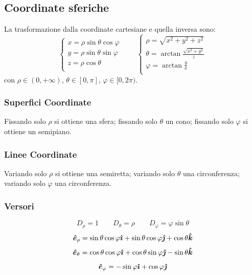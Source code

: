 \subsection{Coordinate sferiche}
La trasformazione dalla coordinate cartesiane e quella inversa sono:
\begin{equation*}\left\{\begin{array}{l}
x=\rho\sin\theta\cos\varphi\\
y=\rho\sin\theta\sin\varphi\\
z=\rho\cos\theta\\
\end{array}\right.
\qquad
\left\{\begin{array}{l}
\rho=\sqrt{x^2+y^2+z^2}\\
\theta=\arctan\frac{\sqrt{x^2+y^2}}{z}\\
\varphi=\arctan\frac{y}{x}\\
\end{array}\right.
\end{equation*}
con $\rho\in(0,+\infty)$, $\theta\in[0,\pi]$, $\varphi\in[0,2\pi)$.
\subsubsection{Superfici Coordinate}
Fissando solo $\rho$ si ottiene una sfera; fissando solo $\theta$ un cono; fissando solo $\varphi$ si ottiene un semipiano.
\subsubsection{Linee Coordinate}
Variando solo $\rho$ si ottiene una semiretta; variando solo $\theta$ una circonferenza; variando solo $\varphi$ una circonferenza.
\subsubsection{Versori}
\begin{equation*}D_\rho=1\qquad D_\theta=\rho\qquad D_\varphi=\varphi\sin\theta\end{equation*}
\begin{equation*}\boldsymbol{\hat {e}}_\rho=\sin\theta\cos\varphi\boldsymbol{\hat {\imath}}+\sin\theta\cos\varphi\boldsymbol{\hat {\jmath}}+\cos\theta\boldsymbol{\hat {k}}\end{equation*}
\begin{equation*}\boldsymbol{\hat {e}}_\theta=\cos\theta\cos\varphi\boldsymbol{\hat {\imath}}+\cos\theta\sin\varphi\boldsymbol{\hat {\jmath}}-\sin\theta\boldsymbol{\hat {k}}\end{equation*}
\begin{equation*}\boldsymbol{\hat {e}}_\varphi=-\sin\varphi\boldsymbol{\hat {\imath}}+\cos\varphi\boldsymbol{\hat {\jmath}}\end{equation*}
